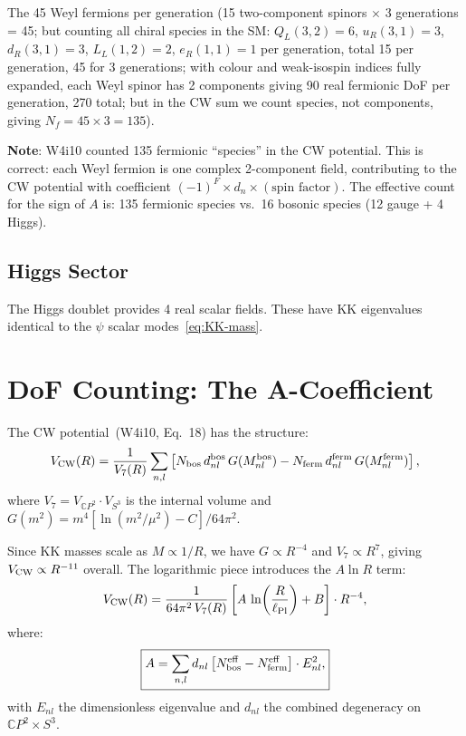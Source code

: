 \documentclass[11pt,a4paper]{article}
\newcommand{\CP}{\mathbb{C}P}
\newcommand{\lPl}{\ell_{\rm Pl}}
\newcommand{\Nbos}{N_{\rm bos}}
\newcommand{\Nferm}{N_{\rm ferm}}
\begin{document}
The 45 Weyl fermions per generation (15 two-component spinors $\times$
3 generations = 45; but counting all chiral species in the SM:
$Q_L(3,2) = 6$, $u_R(3,1) = 3$, $d_R(3,1) = 3$, $L_L(1,2) = 2$,
$e_R(1,1) = 1$ per generation, total 15 per generation, 45 for 3
generations; with colour and weak-isospin indices fully expanded,
each Weyl spinor has 2 components giving 90 real fermionic DoF per
generation, 270 total; but in the CW sum we count species, not
components, giving $N_f = 45 \times 3 = 135$).

\textbf{Note}: W4i10 counted 135 fermionic ``species'' in the CW
potential. This is correct: each Weyl fermion is one complex
2-component field, contributing to the CW potential with coefficient
$(-1)^F \times d_n \times (\text{spin factor})$. The effective count
for the sign of $A$ is: 135 fermionic species vs.\ 16 bosonic
species (12 gauge + 4 Higgs).

\subsection{Higgs Sector}

The Higgs doublet provides 4 real scalar fields. These have KK
eigenvalues identical to the $\psi$ scalar modes~\eqref{eq:KK-mass}.


\section{DoF Counting: The A-Coefficient}
\label{sec:A-coefficient}

The CW potential~(W4i10, Eq.~18) has the structure:
\begin{equation}
V_{\rm CW}(R) = \frac{1}{V_7(R)} \sum_{n,l}
\left[\Nbos\,d_{nl}^{\rm bos}\,G(M_{nl}^{\rm bos})
- \Nferm\,d_{nl}^{\rm ferm}\,G(M_{nl}^{\rm ferm})\right],
\label{eq:VCW}
\end{equation}
where $V_7 = V_{\CP^2} \cdot V_{S^3}$ is the internal volume and
$G(m^2) = m^4[\ln(m^2/\mu^2) - C]/64\pi^2$.

Since KK masses scale as $M \propto 1/R$, we have $G \propto R^{-4}$
and $V_7 \propto R^7$, giving $V_{\rm CW} \propto R^{-11}$ overall.
The logarithmic piece introduces the $A\ln R$ term:
\begin{equation}
V_{\rm CW}(R) = \frac{1}{64\pi^2\,V_7(R)}
\left[A\,\ln\!\left(\frac{R}{\lPl}\right) + B\right]
\cdot R^{-4},
\end{equation}
where:
\begin{equation}
\boxed{
A = \sum_{n,l} d_{nl}\left[\Nbos^{\rm eff} - \Nferm^{\rm eff}\right]
\cdot E_{nl}^2,
}
\label{eq:A-def}
\end{equation}
with $E_{nl}$ the dimensionless eigenvalue and $d_{nl}$ the combined
degeneracy on $\CP^2 \times S^3$.
\end{document}
